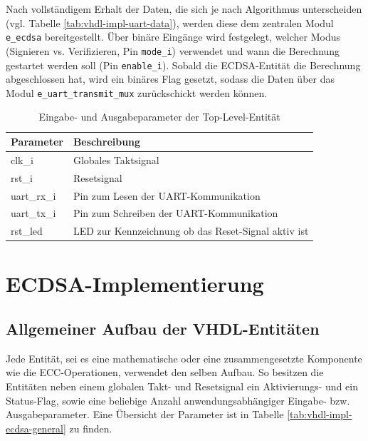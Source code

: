 Nach vollständigem Erhalt der Daten, die sich je nach Algorithmus unterscheiden (vgl. Tabelle \ref{tab:vhdl-impl-uart-data}), werden diese dem zentralen Modul \texttt{e\_ecdsa} bereitgestellt. Über binäre Eingänge wird festgelegt, welcher Modus (Signieren vs. Verifizieren, Pin \texttt{mode\_i}) verwendet und wann die Berechnung gestartet werden soll (Pin \texttt{enable\_i}). Sobald die ECDSA-Entität die Berechnung abgeschlossen hat, wird ein binäres Flag gesetzt, sodass die Daten über das Modul \texttt{e\_uart\_transmit\_mux} zurückschickt werden können. \\
 
\begin{table} [h]
	\centering 
	\begin{tabular}{ | p{3cm} | p{12cm} | }
		\hline
		\textbf{Parameter} & \textbf{Beschreibung}\\
		\hline
		clk\_i & Globales Taktsignal \\
		\hline
		rst\_i & Resetsignal \\
		\hline
		uart\_rx\_i & Pin zum Lesen der UART-Kommunikation \\
		\hline
		uart\_tx\_i & Pin zum Schreiben der UART-Kommunikation \\
		\hline
		rst\_led & LED zur Kennzeichnung ob das Reset-Signal aktiv ist \\
		\hline
	\end{tabular}
	\caption{Eingabe- und Ausgabeparameter der Top-Level-Entität}
	\label{tab:vhdl-impl-tld-ecdsa-param}
\end{table} 


\section{ECDSA-Implementierung}
\label{vhdl-impl-general}

\subsection{Allgemeiner Aufbau der VHDL-Entitäten}
\label{vhdl-impl-general-entity}

Jede Entität, sei es eine mathematische oder eine zusammengesetzte Komponente wie die ECC-Operationen, verwendet den selben Aufbau. So besitzen die Entitäten neben einem globalen Takt- und Resetsignal ein Aktivierungs- und ein Status-Flag, sowie eine beliebige Anzahl anwendungsabhängiger Eingabe- bzw. Ausgabeparameter. Eine Übersicht der Parameter ist in Tabelle \ref{tab:vhdl-impl-ecdsa-general} zu finden. \\

